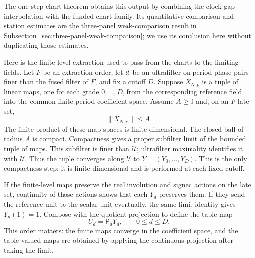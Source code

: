 The one-step chart theorem obtains this output by combining the clock-gap
interpolation with the funded chart family. Its quantitative comparison
and station estimates are the three-panel weak-comparison result in
Subsection~\ref{sec:three-panel-weak-comparison}; we use its conclusion here
without duplicating those estimates.

Here is the finite-level extraction used to pass from the charts to the
limiting fields. Let $F$ be an extraction order, let $\mathcal U$ be an
ultrafilter on period-phase pairs finer than the fused filter of $F$, and
fix a cutoff $D$. Suppose $X_{N,p}$ is a tuple of linear maps, one for
each grade $0,\ldots,D$, from the corresponding reference field into the
common finite-period coefficient space. Assume $A\geq0$ and, on an
$F$-late set,
\begin{equation}
 \|X_{N,p}\|\leq A.
 \label{eq:ex-lattice-firesky-lift-bound}
\end{equation}
The finite product of these map spaces is finite-dimensional. The closed
ball of radius $A$ is compact. Compactness gives a proper subfilter limit
of the bounded tuple of maps. This subfilter is finer than $\mathcal U$;
ultrafilter maximality identifies it with $\mathcal U$. Thus the tuple
converges along $\mathcal U$ to $Y=(Y_0,\ldots,Y_D)$. This is the only
compactness step: it is finite-dimensional and is performed at each fixed
cutoff.

If the finite-level maps preserve the real involution and signed actions on
the late set, continuity of those actions shows that each $Y_d$ preserves
them. If they send the reference unit to the scalar unit eventually, the
same limit identity gives $Y_d(1)=1$. Compose with the quotient projection
to define the table map
\[
 U_d=\mathsf P_dY_d,\qquad 0\leq d\leq D.
\]
This order matters: the finite maps converge in the coefficient space, and
the table-valued maps are obtained by applying the continuous projection
after taking the limit.

